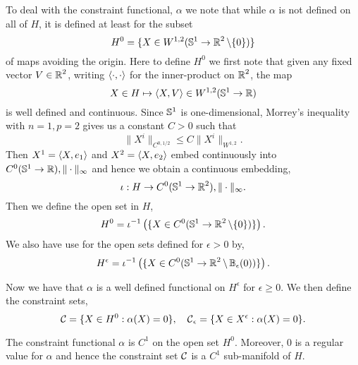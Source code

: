 \documentclass[12pt]{article}
\begin{document}
To deal with the constraint functional, \(\alpha\) we note that while \(\alpha\) is not defined on all of \(H\), it is defined at least for the subset
\[
H^0 = \{X \in W^{1,2} (\operatorname{\mathbb{S}^1} \to \operatorname{\mathbb{R}}^2 \backslash \{0\})\}
\]
of maps avoiding the origin. Here to define \(H^0\) we first note that given any fixed vector \(V \in \operatorname{\mathbb{R}}^2\), writing \(\left\langle{\cdot},{\cdot}\right\rangle\) for the inner-product on \(\operatorname{\mathbb{R}}^2\), the map
\[
X \in H \mapsto \left\langle{X},{V}\right\rangle \in W^{1,2}(\operatorname{\mathbb{S}^1} \to \operatorname{\mathbb{R}})
\]
is well defined and continuous. Since \(\operatorname{\mathbb{S}^1}\) is one-dimensional, Morrey's inequality with \(n=1,p=2\) gives us a constant \(C > 0\) such that
\[
\|X^i\|_{C^{0,1/2}} \leq C\|X^i\|_{W^{1,2}}.
\]
Then \(X^1 = \left\langle{X},{e_1}\right\rangle\) and \(X^2 = \left\langle{X},{e_2}\right\rangle\) embed continuously into \(C^0(\operatorname{\mathbb{S}^1} \to \operatorname{\mathbb{R}}), \|\cdot\|_{\infty}\) and hence we obtain a continuous embedding,
\[
\iota : H \to C^0(\operatorname{\mathbb{S}^1} \to \operatorname{\mathbb{R}}^2), \|\cdot\|_{\infty}.
\]
Then we define the open set in \(H\),
\begin{equation}
\label{eq:H0}
H^0 = \iota^{-1}\left(\{X \in C^0(\operatorname{\mathbb{S}^1} \to \operatorname{\mathbb{R}}^2\backslash \{0\})\}\right).
\end{equation}
We also have use for the open sets defined for \(\epsilon > 0\) by,
\begin{equation}
\label{eq:Hepsilon}
H^{\epsilon} = \iota^{-1}\left(\{X \in C^0(\operatorname{\mathbb{S}^1} \to \operatorname{\mathbb{R}}^2\backslash \operatorname{\mathbb{B}}_{\epsilon}(0))\}\right).
\end{equation}

Now we have that \(\alpha\) is a well defined functional on \(H^{\epsilon}\) for \(\epsilon \geq 0\). We then define the constraint sets,
\begin{equation}
\label{eq:constraintsets}
\operatorname{\mathcal{C}} = \{X \in H^0 : \alpha(X) = 0\}, \quad \operatorname{\mathcal{C}}_{\epsilon} = \{X \in X^{\epsilon} : \alpha(X) = 0\}.
\end{equation}

\begin{lem}
\label{lem:Csubmanifold}
The constraint functional \(\alpha\) is \(C^1\) on the open set \(H^0\). Moreover, \(0\) is a regular value for \(\alpha\) and hence the constraint set \(\operatorname{\mathcal{C}}\) is a \(C^1\) sub-manifold of \(H\).
\end{lem}
\end{document}
